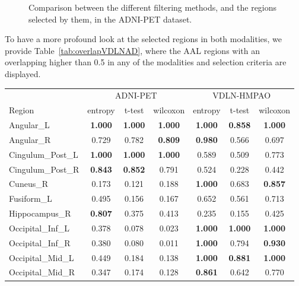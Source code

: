 \begin{figure}[bth]
	\caption[Comparison between the different filtering methods in ADNI-PET.]{Comparison between the different filtering methods, and the regions selected by them, in the ADNI-PET dataset. }\label{fig:comparisonSelection_vdlnhmpao}
\end{figure}

To have a more profound look at the selected regions in both modalities, we provide Table~\ref{tab:overlapVDLNAD}, where the AAL regions with an overlapping higher than 0.5 in any of the modalities and selection criteria are displayed. 

\begin{table}
	\centering
\begin{tabularx}{\textwidth}{Xcccccc}
	{} &\multicolumn{3}{c}{ADNI-PET}    & \multicolumn{3}{c}{VDLN-HMPAO}         \\
	\cline{2-7}
	Region &    entropy & t-test & wilcoxon &  entropy & t-test & wilcoxon \\
	\midrule
Angular\_L         &    \textbf{1.000} &    \textbf{1.000} &  \textbf{1.000} &      \textbf{1.000} &    \textbf{0.858} &  \textbf{1.000} \\
Angular\_R         &    0.729 &    0.782 &  \textbf{0.809} &      \textbf{0.980} &    0.566 &  0.697 \\
Cingulum\_Post\_L   &    \textbf{1.000} &    \textbf{1.000} &  \textbf{1.000} &      0.589 &    0.509 &  0.773 \\
Cingulum\_Post\_R   &    \textbf{0.843} &    \textbf{0.852} &  0.791 &      0.524 &    0.228 &  0.442 \\
Cuneus\_R          &    0.173 &    0.121 &  0.188 &      \textbf{1.000} &    0.683 &  \textbf{0.857} \\
Fusiform\_L        &    0.495 &    0.156 &  0.167 &      0.652 &    0.561 &  0.713 \\
Hippocampus\_R     &    \textbf{0.807} &    0.375 &  0.413 &      0.235 &    0.155 &  0.425 \\
Occipital\_Inf\_L   &    0.378 &    0.078 &  0.023 &      \textbf{1.000} &    \textbf{1.000} &  \textbf{1.000} \\
Occipital\_Inf\_R   &    0.380 &    0.080 &  0.011 &      \textbf{1.000} &    0.794 &  \textbf{0.930} \\
Occipital\_Mid\_L   &    0.449 &    0.184 &  0.138 &      \textbf{1.000} &    \textbf{0.881} &  \textbf{1.000} \\
Occipital\_Mid\_R   &    0.347 &    0.174 &  0.128 &      \textbf{0.861} &    0.642 &  0.770 \\

\end{tabularx}
\end{table}
